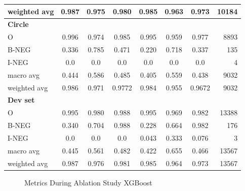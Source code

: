 \begin{table}[!ht]
\begin{tabular}{lccc|cccr}
weighted avg       &  0.987 &  0.975 &  0.980 & 0.985 & 0.963 & 0.973 & 10184 \\
\hline
\textbf{Circle}    &        &        &        &       &       &       &   \\
O                  &  0.996 &  0.974 &  0.985 & 0.995 & 0.959 & 0.977 & 8893 \\
B-NEG              &  0.336 &  0.785 &  0.471 & 0.220 & 0.718 & 0.337 & 135 \\
I-NEG              &    0.0 &    0.0 &    0.0 &  0.0   & 0.0   &   0.0 & 4 \\
macro avg          &  0.444 &  0.586 &  0.485 & 0.405 & 0.559 & 0.438 & 9032 \\
weighted avg       &  0.986 &  0.971 &  0.9772 & 0.984 & 0.955 & 0.9672 & 9032 \\
\hline
\textbf{Dev set}   &        &        &        &       &       & &   \\
O                  &  0.995 &  0.980 &  0.988 & 0.995 & 0.969 & 0.982 & 13388 \\
B-NEG              &  0.340 &  0.704 &  0.988 & 0.228 & 0.664 & 0.982 & 176 \\
I-NEG              &  0.0   &  0.0   &  0.0   & 0.043 & 0.333 & 0.076 & 3 \\
macro avg          &  0.445 &  0.561 &  0.482 & 0.422 & 0.655 & 0.466 & 13567 \\
weighted avg       &  0.987 &  0.976 &  0.981 & 0.985 & 0.964 & 0.973 & 13567 \\
\hline
\end{tabular}
\end{table}




\begin{figure}[!ht]
\centering
  \caption{Metrics During Ablation Study XGBoost}
  \label{fig:metrics_xgb_training}
\end{figure}




